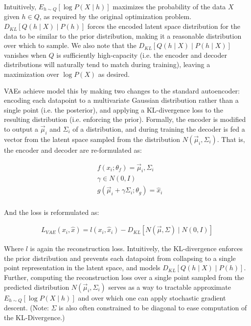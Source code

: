 Intuitively, $E_{h \sim Q} [\log P(X \mid h)]$ maximizes the
probability of the data $X$ given $h \in Q$, as required by the
original optimization problem. $D_{KL}[Q(h \mid X) \mid P(h)]$ forces
the encoded latent space distribution for the data to be similar to
the prior distribution, making it a reasonable distribution over
which to sample. We also note that the $D_{KL}[Q(h \mid X) \mid P(h
\mid X)]$ vanishes when $Q$ is sufficiently high-capacity (i.e. the
encoder and decoder distributions will naturally tend to match during
training), leaving a maximization over $\log P(X)$ as desired.

VAEs achieve model this by making two changes to the standard
autoencoder: encoding each datapoint to a multivariate Gaussian
distribution rather than a single point (i.e. the posterior), and
applying a KL-divergence loss to the resulting distribution (i.e.
enforcing the prior). Formally, the encoder is modified to output a
$\vec{\mu}_i$ and $\Sigma_i$ of a distribution, and during training
the decoder is fed a vector from the latent space sampled from the
distribution $N(\vec{\mu}_i, \Sigma_i)$. That is, the encoder and
decoder are re-formulated as:

\begin{align*}
    &f(x_i ;\theta_f) = \vec{\mu}_i, \Sigma_i \\
    &\gamma \in N(0,I) \\
    &g(\vec{\mu}_i + \gamma \Sigma_i; \theta_g) = \hat{x}_i \\
\end{align*}

And the loss is reformulated as:

\begin{align*}
    L_{VAE}(x_i, \hat{x}) = l(x_i, \hat{x}_i) - D_{KL}[N(\vec{\mu}, \Sigma) \mid N(0,I)]
\end{align*}

Where $l$ is again the reconstruction loss. Intuitively, the
KL-divergence enforces the prior distribution and prevents each
datapoint from collapsing to a single point representation in the
latent space, and models $D_{KL}[Q(h \mid X) \mid P(h)]$. Further,
computing the reconstruction loss over a single point sampled from
the predicted distribution $N(\vec{\mu}_i, \Sigma_i)$ serves as a way
to tractable approximate $E_{h \sim Q} [\log P(X \mid h)]$ and over
which one can apply stochastic gradient descent. (Note: $\Sigma$ is
also often constrained to be diagonal to ease computation of the
KL-Divergence.)

